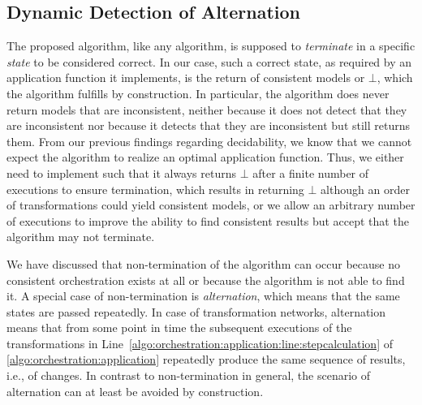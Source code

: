 \subsection{Dynamic Detection of Alternation} %
\label{chap:orchestration:conservative:alternation}

The proposed algorithm, like any algorithm, is supposed to \emph{terminate} in a specific \emph{state} to be considered correct.
In our case, such a correct state, as required by an application function it implements, is the return of consistent models or $\bot$, which the algorithm fulfills by construction.
In particular, the algorithm does never return models that are inconsistent, neither because it does not detect that they are inconsistent nor because it detects that they are inconsistent but still returns them.
From our previous findings regarding decidability, we know that we cannot expect the algorithm to realize an optimal application function.
Thus, we either need to implement  such that it always returns $\bot$ after a finite number of executions to ensure termination, which results in returning $\bot$ although an order of transformations could yield consistent models, or we allow an arbitrary number of executions to improve the ability to find consistent results but accept that the algorithm may not terminate.

We have discussed that non-termination of the algorithm can occur because no consistent orchestration exists at all or because the algorithm is not able to find it.
A special case of non-termination is \emph{alternation}, which means that the same states are passed repeatedly. 
In case of transformation networks, alternation means that from some point in time the subsequent executions of the transformations in Line~\ref{algo:orchestration:application:line:stepcalculation} of \autoref{algo:orchestration:application} repeatedly produce the same sequence of results, i.e., of changes.
In contrast to non-termination in general, the scenario of alternation can at least be avoided by construction.


